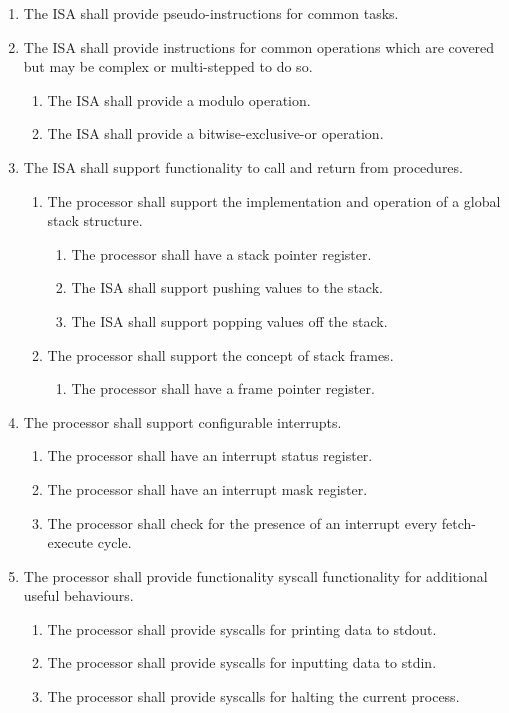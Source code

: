 \documentclass{article}
\begin{document}
\medskip
\begin{enumerate}[label=AR\arabic*]
    \item The ISA shall provide pseudo-instructions for common tasks.
    \item The ISA shall provide instructions for common operations which are covered but may be complex or multi-stepped to do so.
    \begin{enumerate}[label=\theenumi.\arabic*]
        \item The ISA shall provide a modulo operation.
        \item The ISA shall provide a bitwise-exclusive-or operation.
    \end{enumerate}
    \item The ISA shall support functionality to call and return from procedures.
    \begin{enumerate}[label=\theenumi.\arabic*]
        \item The processor shall support the implementation and operation of a global stack structure.
        \begin{enumerate}[label=\theenumii.\arabic*]
            \item The processor shall have a stack pointer register.
            \item The ISA shall support pushing values to the stack.
            \item The ISA shall support popping values off the stack.
        \end{enumerate}
        \item The processor shall support the concept of stack frames.
        \begin{enumerate}[label=\theenumii.\arabic*]
            \item The processor shall have a frame pointer register.
        \end{enumerate}
    \end{enumerate}
    \item The processor shall support configurable interrupts.
    \begin{enumerate}[label=\theenumi.\arabic*]
        \item The processor shall have an interrupt status register.
        \item The processor shall have an interrupt mask register.
        \item The processor shall check for the presence of an interrupt every fetch-execute cycle.
    \end{enumerate}
    \item The processor shall provide functionality syscall functionality for additional useful behaviours.
    \begin{enumerate}[label=\theenumi.\arabic*]
        \item The processor shall provide syscalls for printing data to stdout.
        \item The processor shall provide syscalls for inputting data to stdin.
        \item The processor shall provide syscalls for halting the current process.
    \end{enumerate}
\end{enumerate}
\end{document}
